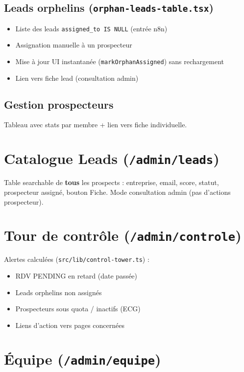 \documentclass[11pt,a4paper]{report}
\begin{document}
\subsection{Leads orphelins (\texttt{orphan-leads-table.tsx})}
\begin{itemize}[noitemsep]
  \item Liste des leads \texttt{assigned\_to IS NULL} (entrée n8n)
  \item Assignation manuelle à un prospecteur
  \item Mise à jour UI instantanée (\texttt{markOrphanAssigned}) sans rechargement
  \item Lien vers fiche lead (consultation admin)
\end{itemize}

\subsection{Gestion prospecteurs}
Tableau avec stats par membre + lien vers fiche individuelle.

\section{Catalogue Leads (\texttt{/admin/leads})}

Table searchable de \textbf{tous} les prospects :
entreprise, email, score, statut, prospecteur assigné, bouton Fiche.
Mode consultation admin (pas d'actions prospecteur).

\section{Tour de contrôle (\texttt{/admin/controle})}

Alertes calculées (\texttt{src/lib/control-tower.ts}) :
\begin{itemize}[noitemsep]
  \item RDV PENDING en retard (date passée)
  \item Leads orphelins non assignés
  \item Prospecteurs sous quota / inactifs (ECG)
  \item Liens d'action vers pages concernées
\end{itemize}

\section{Équipe (\texttt{/admin/equipe})}
\end{document}
